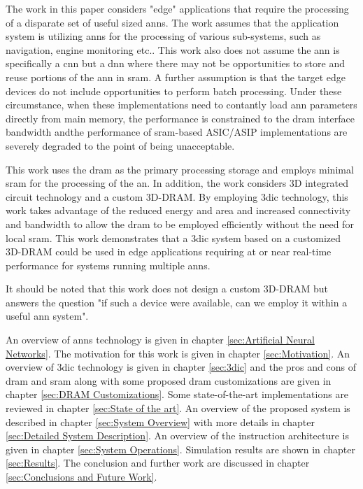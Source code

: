 The work in this paper considers "edge" applications that require the processing of a disparate set of useful sized \ac{ann}s. The work assumes that the application system is utilizing \ac{ann}s
for the processing of various sub-systems, such as navigation, engine monitoring etc.. This work also does not assume the \ac{ann} is specifically a \ac{cnn} but a \ac{dnn} where there may
not be opportunities to store and reuse portions of the \ac{ann} in \ac{sram}. A further assumption is that the target edge devices do not include opportunities to perform batch processing.
Under these circumstance, when these implementations need to contantly load \ac{ann} parameters directly from main memory, the performance is constrained to the \ac{dram} interface bandwidth andthe performance of \ac{sram}-based ASIC/ASIP implementations are severely degraded to the point of being unacceptable.

This work uses the \ac{dram} as the primary processing storage and employs minimal \ac{sram} for the processing of the \ac{an}.
In addition, the work considers 3D integrated circuit technology and a custom 3D-DRAM. By employing \ac{3dic} technology, this work takes advantage of the reduced energy and area and increased
connectivity and bandwidth to allow the \ac{dram} to be employed efficiently without the need for local \ac{sram}.
This work demonstrates that a \ac{3dic} system based on a customized 3D-DRAM could be used in edge applications requiring at or near real-time performance for systems running multiple \ac{ann}s.

It should be noted that this work does not design a custom 3D-DRAM but answers the question "if such a device were available, can we employ it within a useful \ac{ann} system".

\hfill %

An overview of \acp{ann} technology is given in chapter \ref{sec:Artificial Neural Networks}.
The motivation for this work is given in chapter \ref{sec:Motivation}.
An overview of \ac{3dic} technology is given in chapter \ref{sec:3dic} and the pros and cons of \ac{dram} and \ac{sram} along with some proposed \ac{dram} customizations are given in chapter \ref{sec:DRAM Customizations}.
Some state-of-the-art implementations are reviewed in chapter \ref{sec:State of the art}.
An overview of the proposed system is described in chapter \ref{sec:System Overview} with more details in chapter \ref{sec:Detailed System Description}.
An overview of the instruction architecture is given in chapter \ref{sec:System Operations}.
Simulation results are shown in chapter \ref{sec:Results}.
The conclusion and further work are discussed in chapter \ref{sec:Conclusions and Future Work}.


